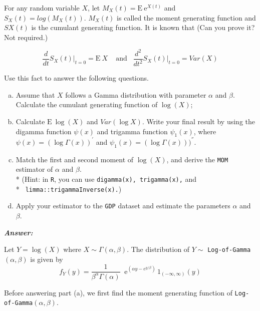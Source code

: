\documentclass[12pt]{article}
\newenvironment{question}[2][Question]{\begin{trivlist}
\item[\hskip \labelsep {\bfseries #1}\hskip \labelsep {\bfseries #2.}]}{\end{trivlist}}
\begin{document}
\bigskip
\bigskip
\begin{question}{3.4}For any random variable $X$, let $M_X(t) = \mathrm{E} \: \mathrm{e}^{X(t)}$ and $S_X(t) = log(M_X(t))$. $M_X(t)$ is called 
the moment generating function and $SX(t)$ is the cumulant generating function. It is known that (Can you prove it? Not required.)

\begin{center}
$$
\frac{d}{dt} S_X(t) \Big|_{t=0} = \mathrm{E} \: X \;\;\; \text{ and} \;\;\; \frac{d^2}{dt^2} S_X(t) \Big|_{t=0} = Var(X) 
$$
\end{center}

Use this fact to answer the following questions.

\begin{enumerate}[(a)]

   \item Assume that $X$ follows a Gamma distribution with parameter $\alpha$ and $\beta$. Calculate the cumulant generating function of $\log (X)$;
   \item Calculate $ \mathrm{E} \: \log (X)$  and $Var(\log X)$. Write your final result by using the digamma function  $\psi (x) $
and trigamma function  $\psi_1 (x) $, where  $\psi (x) = (\log \Gamma(x))^{'}$ and  $\psi_1 (x) = (\log \Gamma(x)))^{''}$.
   \item Match the first and second moment of $\log(X)$, and derive the \texttt{MOM} estimator of $\alpha$ and $\beta$. \\*
(Hint: in \texttt{R}, you can use \texttt{digamma(x), trigamma(x),} and \\* \texttt{ limma::trigammaInverse(x).})

   \item Apply your estimator to the \texttt{GDP} dataset and estimate the parameters $\alpha$  and $\beta$.


\end{enumerate}


\end{question}

 \textbf{\color{TealBlue}\emph{Answer:} } 

Let $Y = \log (X)$ where  $X\sim\Gamma(\alpha,\beta)$.  
The distribution of $Y \sim $ \texttt{Log-of-Gamma}$(\alpha, \beta)$ is given by
$$
f_Y(y) = \frac{1}{\beta^\alpha \Gamma(\alpha)} \;\; \mathrm{e}^{\left(\alpha y - e^{y/\beta}\right)}\,1_{(-\infty,\infty)}(y)
$$


Before answering part (a), we first find the moment generating function of \texttt{Log-of-Gamma}$(\alpha, \beta)$.
\end{document}
